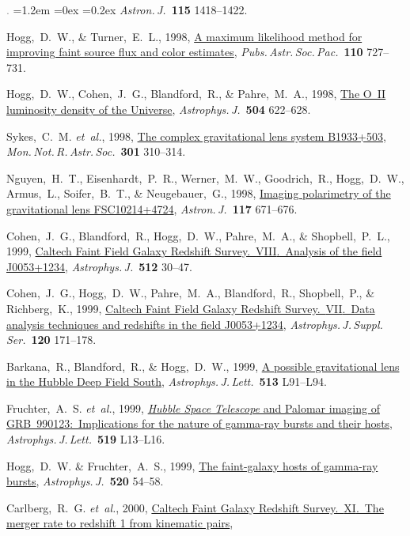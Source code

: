 \documentclass[10pt,letterpaper]{article}
\newcommand{\acronym}[1]{{\small{#1}}}
\newcommand{\foreign}[1]{\textsl{#1}}
\newcommand{\etal}{\foreign{et~al.}}
\newcommand{\project}[1]{\textsl{#1}}
\newcommand{\doi}[2]{\href{http://dx.doi.org/#1}{{#2}}}
\newcommand{\ads}[2]{\href{http://adsabs.harvard.edu/abs/#1}{{#2}}}
\newcommand{\deemph}[1]{\textcolor{grey}{\footnotesize{#1}}}
\newcommand{\pubnumber}[1]{\deemph{{#1}.}}
\newcounter{refpubnum}
\newcommand{\hogglist}{%
    \rightmargin=0in
    \leftmargin=1.2em
    \topsep=0ex
    \partopsep=0pt
    \itemsep=0.2ex
    \parsep=0pt
    \itemindent=-1.0\leftmargin
    \listparindent=0.0\leftmargin
    \settowidth{\labelsep}{~}
    \usecounter{refpubnum}
  }
\begin{document}
\begin{list}{\pubnumber{\therefpubnum}}{\hogglist}
\textit{Astron.\,J.}\ \textbf{115} 1418--1422.
\item
Hogg,~D.~W., \& Turner,~E.~L., 1998,
\ads{1998PASP..110..727H}{A maximum likelihood method for improving faint source flux and color estimates},
\textit{Pubs.\,Astr.\,Soc.\,Pac.}\ \textbf{110} 727--731.
\item
Hogg,~D.~W., Cohen,~J.~G., Blandford,~R., \& Pahre,~M.~A., 1998,
\doi{10.1086/306122}{The O~II luminosity density of the Universe},
\textit{Astrophys.\,J.}\ \textbf{504} 622--628.
\item
Sykes,~C.~M. \etal, 1998,
\doi{10.1046/j.1365-8711.1998.02081.x}{The complex gravitational lens system B1933+503},
\textit{Mon.\,Not.\,R.\,Astr.\,Soc.}\ \textbf{301} 310--314.
\item
Nguyen,~H.~T., Eisenhardt,~P.~R., Werner,~M.~W., Goodrich,~R., Hogg,~D.~W., Armus,~L., Soifer,~B.~T., \& Neugebauer,~G., 1998,
\doi{10.1086/300742}{Imaging polarimetry of the gravitational lens FSC10214+4724},
\textit{Astron.\,J.}\ \textbf{117} 671--676.
\item
Cohen,~J.~G., Blandford,~R., Hogg,~D.~W., Pahre,~M.~A., \& Shopbell,~P.~L., 1999,
\doi{10.1086/306778}{Caltech Faint Field Galaxy Redshift Survey.\ \acronym{VIII}.\ Analysis of the field J0053+1234},
\textit{Astrophys.\,J.}\ \textbf{512} 30--47.
\item
Cohen,~J.~G., Hogg,~D.~W., Pahre,~M.~A., Blandford,~R., Shopbell,~P., \& Richberg,~K., 1999,
\doi{10.1086/313184}{Caltech Faint Field Galaxy Redshift Survey.\ \acronym{VII}.\ Data analysis techniques and redshifts in the field J0053+1234},
\textit{Astrophys.\,J.\,Suppl.\,Ser.}\ \textbf{120} 171--178.
\item
Barkana,~R., Blandford,~R., \& Hogg,~D.~W., 1999,
\doi{10.1086/311924}{A possible gravitational lens in the Hubble Deep Field South},
\textit{Astrophys.\,J.\,Lett.}\ \textbf{513} L91--L94.
\item
Fruchter,~A.~S. \etal, 1999,
\doi{10.1086/312094}{\project{Hubble Space Telescope} and Palomar imaging of \acronym{GRB~990123}:\ Implications for the nature of gamma-ray bursts and their hosts},
\textit{Astrophys.\,J.\,Lett.}\ \textbf{519} L13--L16.
\item
Hogg,~D.~W. \& Fruchter,~A.~S., 1999,
\doi{10.1086/307457}{The faint-galaxy hosts of gamma-ray bursts},
\textit{Astrophys.\,J.}\ \textbf{520} 54--58.
\item
Carlberg,~R.~G. \etal, 2000,
\doi{10.1086/312560}{Caltech Faint Galaxy Redshift Survey.\ \acronym{XI}.\ The merger rate to redshift 1 from kinematic pairs},

\end{list}
\end{document}
